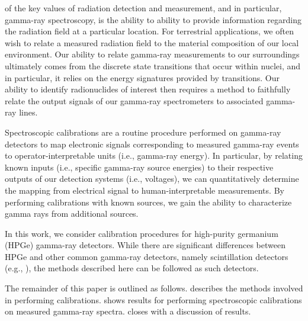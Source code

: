  of the key values of radiation detection and measurement, and in particular, gamma-ray spectroscopy, is the ability to ability to provide information regarding the radiation field at a particular location.
For terrestrial applications, we often wish to relate a measured radiation field to the material composition of our local environment.
Our ability to relate gamma-ray measurements to our surroundings ultimately comes from the discrete state transitions that occur within nuclei, and in particular, it relies on the energy signatures provided by transitions.
Our ability to identify radionuclides of interest then requires a method to faithfully relate the output signals of our gamma-ray spectrometers to associated gamma-ray lines.

Spectroscopic calibrations are a routine procedure performed on gamma-ray detectors to map electronic signals corresponding to measured gamma-ray events to operator-interpretable units (i.e., gamma-ray energy).
In particular, by relating known inputs (i.e., specific gamma-ray source energies) to their respective outputs of our detection systems (i.e., voltages), we can quantitatively determine the mapping from electrical signal to human-interpretable measurements.
By performing calibrations with known sources, we gain the ability to characterize gamma rays from additional sources.

In this work, we consider calibration procedures for high-purity germanium (HPGe) gamma-ray detectors.
While there are significant differences between HPGe and other common gamma-ray detectors, namely scintillation detectors (e.g., ), the methods described here can be followed as such detectors.

The remainder of this paper is outlined as follows.
 describes the methods involved in performing calibrations.
 shows results for performing spectroscopic calibrations on measured gamma-ray spectra.
 closes with a discussion of results.
